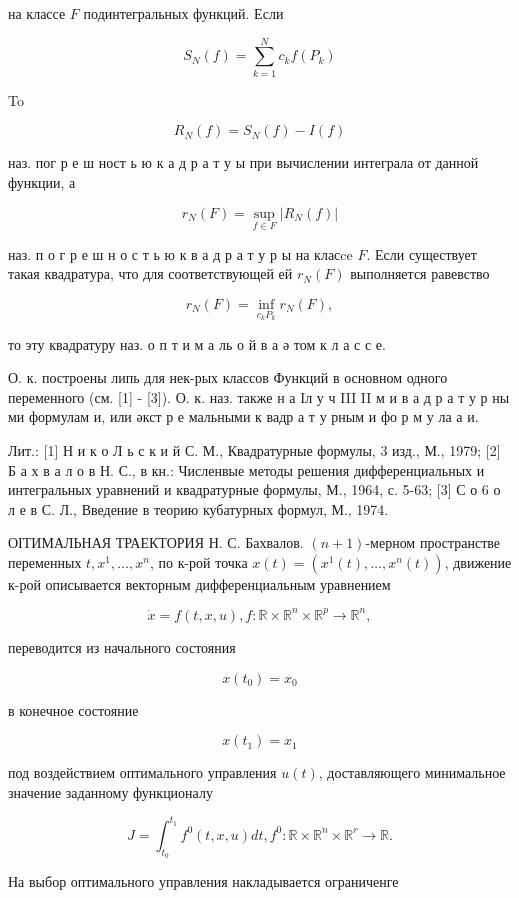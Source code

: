 \documentclass[10pt]{article}
\begin{document}
на классе $F$ подинтегральных функций. Если

\[
S_{N}(f)=\sum_{k=1}^{N} c_{k} f\left(P_{k}\right)
\]

To

\[
R_{N}(f)=S_{N}(f)-I(f)
\]

наз. пог р е ш ност ь ю к а д р а т у ы при вычислении интеграла от данной функции, а

\[
r_{N}(F)=\sup _{f \in F}\left|R_{N}(f)\right|
\]

наз. п о г р е ш н о с т ь ю к в а д р а т у р ы на класce $F$. Если существует такая квадратура, что для соответствующей ей $r_{N}(F)$ выполняется равевство

\[
r_{N}(F)=\inf _{c_{k} P_{k}} r_{N}(F),
\]

то эту квадратуру наз. о п т и $м$ а ль о й в а ә том к л а с с е.

О. к. построены липь для нек-рых классов Функций в основном одного переменного (см. [1] - [3]). О. к. наз. также н а Iл у ч III II м и в а д р а т у р ны ми формулам и, или әкст р е мальными к вадр а т у рным и фо р м у ла а и.

Лит.: [1] Н и к о Л ь с к и й С. М., Квадратурные формулы, 3 изд., М., 1979; [2] Б а х в а л о в Н. С., в кн.: Численвые методы решения дифференциальных и интегральных уравнений и квадратурные формулы, М., 1964, с. 5-63; [3] С о 6 о л е в С. Л., Введение в теорию кубатурных формул, М., 1974.

ОІТИМАЛЬНАЯ ТРАЕКТОРИЯ Н. С. Бахвалов. $(n+1)$-мерном пространстве переменных $t, x^{1}, \ldots, x^{n}$, по к-рой точка $x(t)=\left(x^{1}(t), \ldots, x^{n}(t)\right)$, движение к-рой описывается векторным дифференциальным уравнением

\[
\dot{x}=f(t, x, u), f: \mathbb{R} \times \mathbb{R}^{n} \times \mathbb{R}^{p} \longrightarrow \mathbb{R}^{n},
\]

переводится из начального состояния

\[
x\left(t_{0}\right)=x_{0}
\]

в конечное состояние

\[
x\left(t_{1}\right)=x_{1}
\]

под воздействием оптимального управления $u(t)$, доставляющего минимальное значение заданному функционалу

\[
J=\int_{t_{0}}^{t_{1}} f^{0}(t, x, u) d t, f^{0}: \mathbb{R} \times \mathbb{R}^{n} \times \mathbb{R}^{r} \longrightarrow \mathbb{R} .
\]

На выбор оптимального управления накладывается ограниченге
\end{document}
